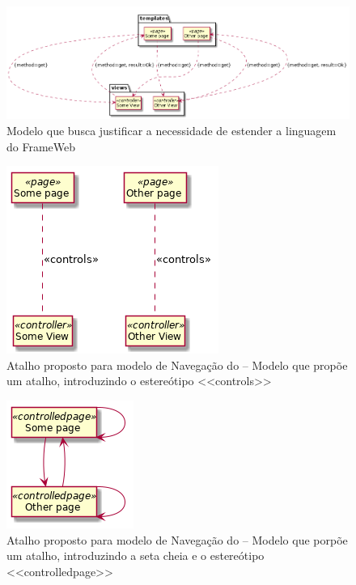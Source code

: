 \begin{figure}[H]
	\centering
	\includegraphics[scale=0.4]{figuras/navigation-shortcut1.png}
	\caption{Modelo que busca justificar a necessidade de estender a linguagem do FrameWeb}
	\label{fig:shortcut1:0}
\end{figure}
\begin{figure}[H]
	\centering
	\includegraphics[scale=0.5]{figuras/navigation-shortcut1_2.png}
	\caption{Atalho proposto para modelo de Navegação do \imprimirtitulo{} -- Modelo que propõe um atalho, introduzindo o estereótipo <<controls>>}
	\label{fig:shortcut1:1}
\end{figure}
\begin{figure}[H]
	\centering
	\includegraphics[scale=0.5]{figuras/navigation-shortcut1_3.png}
	\caption{Atalho proposto para modelo de Navegação do \imprimirtitulo{} -- Modelo que porpõe um atalho, introduzindo a seta cheia e o estereótipo <<controlledpage>>}
	\label{fig:shortcut1:2}
\end{figure}
